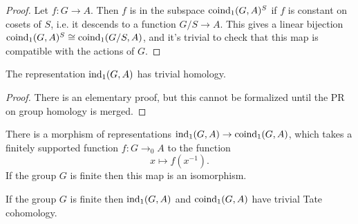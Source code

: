 \begin{proof}
	Let $f : G \to A$. Then $f$ is in the subspace $\mathrm{coind}_1(G,A)^S$ if $f$ is constant on
	cosets of $S$, i.e. it descends to a function $G/S \to A$.
	This gives a linear bijection $\mathrm{coind}_1(G,A)^S \cong \mathrm{coind}_1(G/S,A)$, and it's trivial to check
	that this map is compatible with the actions of $G$.
\end{proof}


\begin{lemma}	\label{lem:ind₁ trivial homology}
	\leanok
	The representation $\mathrm{ind}_1(G,A)$ has trivial homology.
\end{lemma}

\begin{proof}
	There is an elementary proof, but this cannot be formalized until
	the PR on group homology is merged.
\end{proof}

\begin{definition} \label{def:ind₁ to coind₁}
	\leanok
	There is a morphism of representations $\mathrm{ind}_1(G,A) \to \mathrm{coind}_1(G,A)$,
	which takes a finitely supported function $f : G \to_0 A$ to the function
	\[
		x \mapsto f(x^{-1}).
	\]
	If the group $G$ is finite then this map is an isomorphism.
\end{definition}

\begin{lemma}	\label{lem:induced trivial Tate}
	If the group $G$ is finite then $\mathrm{ind}_1(G,A)$ and $\mathrm{coind}_1(G,A)$ have trivial
	Tate cohomology.
\end{lemma}

